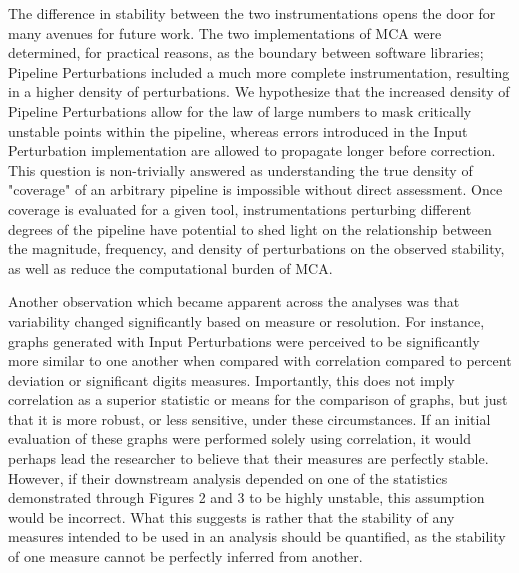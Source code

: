\documentclass[fleqn,10pt]{SelfArx} %
\begin{document}
The difference in stability between the two instrumentations opens the door for many avenues for future work. The two
implementations of MCA were determined, for practical reasons, as the boundary between software libraries; Pipeline
Perturbations included a much more complete instrumentation, resulting in a higher density of perturbations. We
hypothesize that the increased density of Pipeline Perturbations allow for the law of large numbers to mask critically
unstable points within the pipeline, whereas errors introduced in the Input Perturbation implementation are allowed to
propagate longer before correction. This question is non-trivially answered as understanding the true density of
"coverage" of an arbitrary pipeline is impossible without direct assessment. Once coverage is evaluated for a given
tool, instrumentations perturbing different degrees of the pipeline have potential to shed light on the relationship
between the magnitude, frequency, and density of perturbations on the observed stability, as well as reduce the
computational burden of MCA.

Another observation which became apparent across the analyses was that variability changed significantly based on
measure or resolution. For instance, graphs generated with Input Perturbations were perceived to be significantly more
similar to one another when compared with correlation compared to percent deviation or significant digits measures.
Importantly, this does not imply correlation as a superior statistic or means for the comparison of graphs, but just
that it is more robust, or less sensitive, under these circumstances. If an initial evaluation of these graphs were
performed solely using correlation, it would perhaps lead the researcher to believe that their measures are perfectly
stable. However, if their downstream analysis depended on one of the statistics demonstrated through Figures 2 and 3 to
be highly unstable, this assumption would be incorrect. What this suggests is rather that the stability of any measures
intended to be used in an analysis should be quantified, as the stability of one measure cannot be perfectly inferred
from another.
\end{document}

